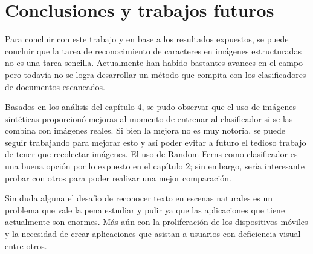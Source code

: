 \newpage
\section{Conclusiones y trabajos futuros}

	Para concluir con este trabajo y en base a los resultados expuestos, se puede concluir que la tarea de reconocimiento de caracteres en imágenes estructuradas no es una tarea sencilla. Actualmente han habido bastantes avances en el campo pero todavía no  se logra desarrollar un método que compita con los clasificadores de documentos escaneados.
	
	Basados en los análisis del capítulo 4, se pudo observar que el uso de imágenes sintéticas proporcionó mejoras al momento de entrenar al clasificador si se las combina con imágenes reales. Si bien la mejora no es muy notoria, se puede seguir trabajando para mejorar esto y así poder evitar a futuro el tedioso trabajo de tener que recolectar imágenes. El uso de Random Ferns como clasificador es una buena opción por lo expuesto en el capítulo 2; sin embargo, sería interesante probar con otros para poder realizar una mejor comparación.
	
	Sin duda alguna el desafio de reconocer texto en escenas naturales es un problema que vale la pena estudiar y pulir ya que las aplicaciones que tiene actualmente son enormes. Más aún con la proliferación de los dispositivos móviles y la necesidad de crear aplicaciones que asistan a usuarios con deficiencia visual entre otros.